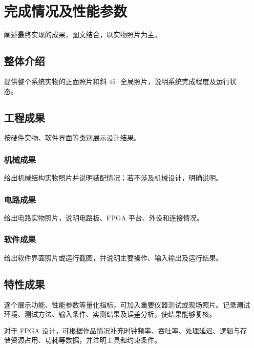 ﻿\chapter{完成情况及性能参数}
阐述最终实现的成果，图文结合，以实物照片为主。
\section{整体介绍}
提供整个系统实物的正面照片和斜 \(45^\circ\) 全局照片，说明系统完成程度及运行状态。
\section{工程成果}
按硬件实物、软件界面等类别展示设计结果。
\subsection{机械成果}
给出机械结构实物照片并说明装配情况；若不涉及机械设计，明确说明。
\subsection{电路成果}
给出电路实物照片，说明电路板、FPGA 平台、外设和连接情况。
\subsection{软件成果}
给出软件界面照片或运行截图，并说明主要操作、输入输出及运行结果。
\section{特性成果}
逐个展示功能、性能参数等量化指标，可加入重要仪器测试或现场照片。记录测试环境、测试方法、输入条件、实测结果及误差分析，使结果能够复核。

对于 FPGA 设计，可根据作品情况补充时钟频率、吞吐率、处理延迟、逻辑与存储资源占用、功耗等数据，并注明工具和约束条件。

